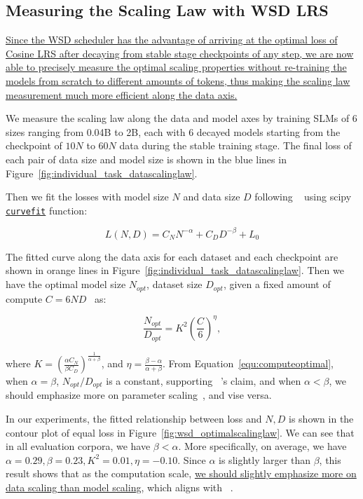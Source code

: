 \subsection{Measuring the Scaling Law with WSD LRS}
\label{scalinglawwsdlrs}

\uline{Since the WSD scheduler has the advantage of arriving at the optimal loss of Cosine LRS after decaying from stable stage checkpoints of any step, we are now able to precisely measure the optimal scaling properties without re-training the models from scratch to different amounts of tokens, thus making the scaling law measurement much more efficient along the data axis.}

We measure the scaling law along the data and model axes by training SLMs of 6 sizes ranging from 0.04B to 2B, each with 6 decayed models starting from the checkpoint of $10N$ to $60N$ data during the stable training stage. The final loss of each pair of data size and model size is shown in the blue lines in Figure~\ref{fig:individual_task_datascalinglaw}. 

Then we fit the losses with model size $N$ and data size $D$ following ~\cite{hoffmann2022training} using scipy \uline{\texttt{curvefit}} function:

\begin{equation}
    L(N, D) = C_NN^{-\alpha} + C_DD^{-\beta} + L_0
\label{equ:scalinglaw}
\end{equation}

The fitted curve along the data axis for each dataset and each checkpoint are shown in orange lines in Figure~\ref{fig:individual_task_datascalinglaw}.
Then we have the optimal model size $N_{opt}$, dataset size $D_{opt}$, given a fixed amount of compute $C=6ND$~\citep{rae2021scaling} as: 

\begin{equation}
    \frac{N_{opt}}{D_{opt}} = K^2\left(\frac{C}{6}\right)^{\eta},
\label{equ:computeoptimal}
\end{equation}

where $K = (\frac{\alpha C_N}{\beta C_D})^{\frac{1}{\alpha + \beta}} $, and $\eta=\frac{\beta-\alpha}{\alpha+\beta}$. From Equation~\ref{equ:computeoptimal}, when $\alpha = \beta$, $N_{opt}/D_{opt}$ is a constant, supporting ~\cite{hoffmann2022training}'s claim, and when $\alpha < \beta$, we should emphasize more on parameter scaling~\citep{kaplan2020scaling}, and vise versa. 

In our experiments, the fitted relationship between loss and $N, D$ is shown in the contour plot of equal loss in Figure~\ref{fig:wsd_optimalscalinglaw}. We can see that in all evaluation corpora, we have $\beta < \alpha$. More specifically, on average, we have $\alpha=0.29, \beta=0.23, K^2 = 0.01, \eta=-0.10$. Since $\alpha$ is slightly larger than $\beta$, this result shows that as the computation scale, \uline{we should slightly emphasize more on data scaling than model scaling}, which aligns with ~\cite{hoffmann2022training}.

